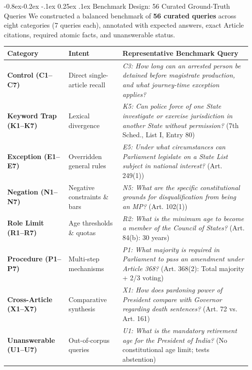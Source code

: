 \documentclass[11pt,a4paper]{article}
\makeatletter
\providecommand{\toprule}{\hline\hline}
\providecommand{\midrule}{\hline}
\providecommand{\bottomrule}{\hline\hline}
\newcommand{\captionof}[2]{%
  \def\@captype{#1}%
  \caption{#2}%
}
\renewcommand\subsection{\@startsection{subsection}{2}{\z@}%
  {-0.8ex\@plus -0.2ex \@minus -.1ex}%
  {0.25ex \@plus .1ex}%
  {\normalfont\normalsize\bfseries\color{primaryblue}}}
\newenvironment{tightcenter}{%
  \setlength\topsep{1.2pt}%
  \setlength\parskip{0pt}%
  \begin{center}%
}{%
  \end{center}%
}
\makeatother
\begin{document}
\subsection{Benchmark Design: 56 Curated Ground-Truth Queries}
We constructed a balanced benchmark of \textbf{56 curated queries} across eight categories (7 queries each), annotated with expected answers, exact Article citations, required atomic facts, and unanswerable status.

\begin{tightcenter}
\footnotesize
\renewcommand{\arraystretch}{0.90}
\begin{tabularx}{\textwidth}{l p{3.2cm} X}
\toprule
\textbf{Category} & \textbf{Intent} & \textbf{Representative Benchmark Query} \\
\midrule
\textbf{Control (C1--C7)} & Direct single-article recall & \textit{C3: How long can an arrested person be detained before magistrate production, and what journey-time exception applies?} \\
\textbf{Keyword Trap (K1--K7)} & Lexical divergence & \textit{K5: Can police force of one State investigate or exercise jurisdiction in another State without permission?} (7th Sched., List I, Entry 80) \\
\textbf{Exception (E1--E7)} & Overridden general rules & \textit{E5: Under what circumstances can Parliament legislate on a State List subject in national interest?} (Art. 249(1)) \\
\textbf{Negation (N1--N7)} & Negative constraints \& bars & \textit{N5: What are the specific constitutional grounds for disqualification from being an MP?} (Art. 102(1)) \\
\textbf{Role Limit (R1--R7)} & Age thresholds \& quotas & \textit{R2: What is the minimum age to become a member of the Council of States?} (Art. 84(b): 30 years) \\
\textbf{Procedure (P1--P7)} & Multi-step mechanisms & \textit{P1: What majority is required in Parliament to pass an amendment under Article 368?} (Art. 368(2): Total majority + 2/3 voting) \\
\textbf{Cross-Article (X1--X7)} & Comparative synthesis & \textit{X1: How does pardoning power of President compare with Governor regarding death sentences?} (Art. 72 vs. Art. 161) \\
\textbf{Unanswerable (U1--U7)} & Out-of-corpus queries & \textit{U1: What is the mandatory retirement age for the President of India?} (No constitutional age limit; tests abstention) \\
\bottomrule
\end{tabularx}
\vspace{0.10em}
\captionof{table}{The 56-query legal evaluation benchmark across eight balanced categories.}
\label{tab:query_categories}
\end{tightcenter}
\end{document}
